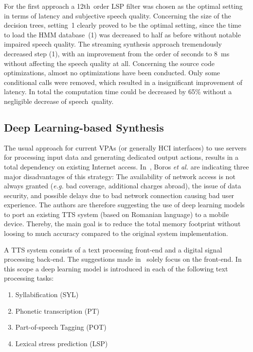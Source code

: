For the first approach a 12th~order \ac{LSP} filter was chosen as the optimal setting in terms of latency and subjective speech quality. Concerning the size of the decision trees, setting~1 clearly proved to be the optimal setting, since the time to load the \ac{HMM} database~(1) was decreased to half as before without notable impaired speech quality. The streaming synthesis approach tremendously decreased step (1), with an improvement from the order of seconds to 8~ms without affecting the speech quality at all. Concerning the source code optimizations, almost no optimizations have been conducted. Only some conditional calls were removed, which resulted in a insignificant improvement of latency. In total the computation time could be decreased by 65\% without a negligible decrease of speech~quality.

\subsection{Deep Learning-based Synthesis}
\label{subsec:deepembedded}

The usual approach for current \acfp{VPA} (or generally \ac{HCI} interfaces) to use servers for processing input data and generating dedicated output actions, results in a total dependency on existing Internet access. In~\cite{boros:robust}, Boros \textit{et al.} are indicating three major disadvantages of this strategy: The availability of network access is not always granted (\textit{e.g.} bad coverage, additional charges abroad), the issue of data security, and possible delays due to bad network connection causing bad user experience. The authors are therefore suggesting the use of deep learning models to port an existing \ac{TTS} system (based on Romanian language) to a mobile device. Thereby, the main goal is to reduce the total memory footprint without loosing to much accuracy compared to the original system implementation.

A \ac{TTS} system consists of a text processing front-end and a digital signal processing back-end. The suggestions made in~\cite{boros:robust} solely focus on the front-end. In this scope a deep learning model is introduced in each of the following text processing tasks:

\begin{enumerate}[label=\arabic*.]		%
	\parskip0.25em
	\bfseries
	\item Syllabification (SYL)
	\item Phonetic transcription (PT)
	\item Part-of-speech Tagging (POT)
	\item Lexical stress prediction (LSP)
\end{enumerate}

